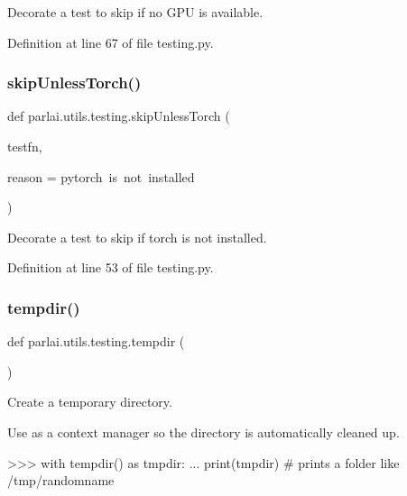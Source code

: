 \begin{DoxyVerb}Decorate a test to skip if no GPU is available.\end{DoxyVerb}
 

Definition at line 67 of file testing.\+py.

\mbox{\label{namespaceparlai_1_1utils_1_1testing_a7b182622aebc6cdc41ee3b99ebe47432}} 
\subsubsection{\texorpdfstring{skip\+Unless\+Torch()}{skipUnlessTorch()}}
{\footnotesize\ttfamily def parlai.\+utils.\+testing.\+skip\+Unless\+Torch (\begin{DoxyParamCaption}\item[{}]{testfn,  }\item[{}]{reason = {\ttfamily \textquotesingle{}pytorch~is~not~installed\textquotesingle{}} }\end{DoxyParamCaption})}

\begin{DoxyVerb}Decorate a test to skip if torch is not installed.\end{DoxyVerb}
 

Definition at line 53 of file testing.\+py.

\mbox{\label{namespaceparlai_1_1utils_1_1testing_a0945b769a10c0c844b29c02ff26445a5}} 
\subsubsection{\texorpdfstring{tempdir()}{tempdir()}}
{\footnotesize\ttfamily def parlai.\+utils.\+testing.\+tempdir (\begin{DoxyParamCaption}{ }\end{DoxyParamCaption})}

\begin{DoxyVerb}Create a temporary directory.

Use as a context manager so the directory is automatically cleaned up.

>>> with tempdir() as tmpdir:
...    print(tmpdir)  # prints a folder like /tmp/randomname
\end{DoxyVerb}
 

